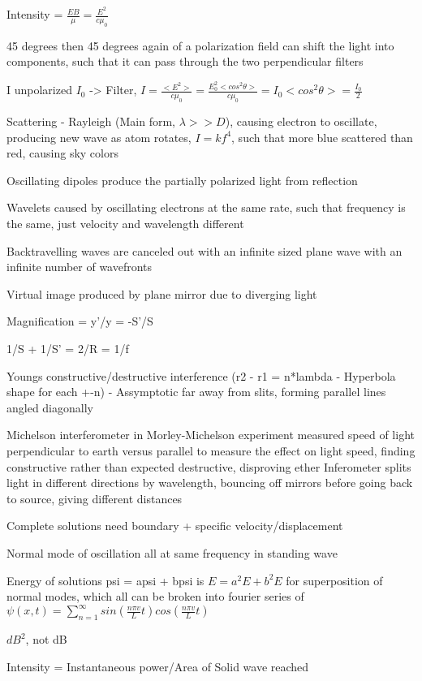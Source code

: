 \documentclass[11 pt, twoside]{article}
\begin{document}
Intensity = $\frac{EB}{\mu} = \frac{E^2}{c\mu_0}$

45 degrees then 45 degrees again of a polarization field can shift the light into components, such that it can pass through the two perpendicular filters

I unpolarized $I_0$ -> Filter, $I = \frac{<E^2>}{c\mu_0} = \frac{E_0^2<cos^2\theta>}{c\mu_0} = I_0<cos^2\theta> = \frac{I_0}{2}$

Scattering - Rayleigh (Main form, $\lambda >> D$), causing electron to oscillate, producing new wave as atom rotates, $I = kf^4$, such that more blue scattered than red, causing sky colors

Oscillating dipoles produce the partially polarized light from reflection

Wavelets caused by oscillating electrons at the same rate, such that frequency is the same, just velocity and wavelength different

Backtravelling waves are canceled out with an infinite sized plane wave with an infinite number of wavefronts

Virtual image produced by plane mirror due to diverging light

Magnification = y'/y = -S'/S

1/S + 1/S' = 2/R = 1/f

Youngs constructive/destructive interference (r2 - r1 = n*lambda - Hyperbola shape for each +-n) - Assymptotic far away from slits, forming parallel lines angled diagonally

Michelson interferometer in Morley-Michelson experiment measured speed of light perpendicular to earth versus parallel to measure the effect on light speed, finding constructive rather than expected destructive, disproving ether
Inferometer splits light in different directions by wavelength, bouncing off mirrors before going back to source, giving different distances

Complete solutions need boundary + specific velocity/displacement

Normal mode of oscillation all at same frequency in standing wave

Energy of solutions psi = apsi + bpsi is $E = a^2E + b^2E$ for superposition of normal modes, which all can be broken into fourier series of
$\psi(x, t) = \sum_{n=1}^{\infty} sin(\frac{n\pi v}{L}t)cos(\frac{n\pi v}{L}t)$

$dB^2$, not dB

Intensity = Instantaneous power/Area of Solid wave reached
\end{document}

